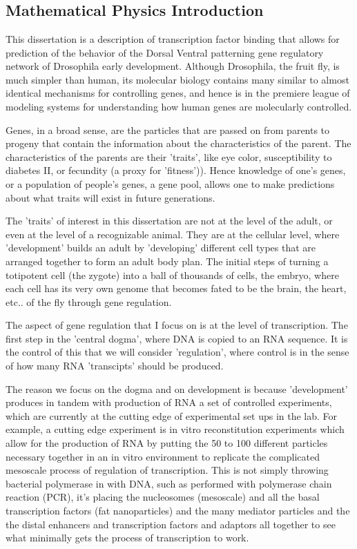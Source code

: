 \chapter{}
\section{Mathematical Physics Introduction}
This dissertation is a description of transcription factor binding that allows for prediction of the behavior of the Dorsal Ventral patterning gene regulatory network of Drosophila early development.  Although Drosophila, the fruit fly, is much simpler than human, its molecular biology contains many similar to almost identical mechanisms for controlling genes, and hence is in the premiere league of modeling systems for understanding how human genes are molecularly controlled.  

Genes, in a broad sense, are the particles that are passed on from parents to progeny that contain the information about the characteristics of the parent.  The characteristics of the parents are their 'traits', like eye color, susceptibility to diabetes II, or fecundity (a proxy for 'fitness')).  Hence knowledge of one's genes, or a population of people's genes, a gene pool, allows one to make predictions about what traits will exist in future generations.

The 'traits' of interest in this dissertation are not at the level of the adult, or even at the level of a recognizable animal.  They are at the cellular level, where 'development' builds an adult by 'developing' different cell types that are arranged together to form an adult body plan.  The initial steps of turning a totipotent cell (the zygote) into a ball of thousands of cells, the embryo, where each cell has its very own genome that becomes fated to be the brain, the heart, etc.. of the fly through gene regulation.

The aspect of gene regulation that I focus on is at the level of transcription.  The first step in the 'central dogma', where DNA is copied to an RNA sequence.  It is the control of this that we will consider 'regulation', where control is in the sense of how many RNA 'transcipts' should be produced.
  
The reason we focus on the dogma and on development is because 'development' produces in tandem with production of RNA a set of controlled experiments, which are currently at the cutting edge of experimental set ups in the lab.   For example, a cutting edge experiment is in vitro reconstitution experiments which allow for the production of RNA by putting the 50 to 100 different particles necessary together in an in vitro environment to replicate the complicated mesoscale process of regulation of transcription.  This is not simply throwing bacterial polymerase in with DNA, such as performed with polymerase chain reaction (PCR), it's placing the nucleosomes (mesoscale) and all the basal transcription factors (fat nanoparticles) and the many mediator particles and the the distal enhancers and transcription factors and adaptors all together to see what minimally gets the process of transcription to work. 


